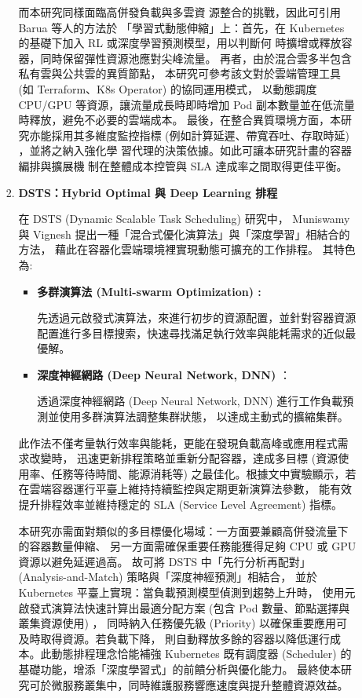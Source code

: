 \documentclass[12pt,a4paper]{article}
\begin{document}
\begin{enumerate}[label={(\zhdig*)}, leftmargin=2\parindent, listparindent=\parindent]
\begin{enumerate}[label={(\arabic*)}, leftmargin=\parindent, listparindent=\parindent]
\begin{enumerate}[label={(\zhdig*)}, leftmargin=\parindent, listparindent=\parindent]
而本研究同樣面臨高併發負載與多雲資
源整合的挑戰，因此可引用 Barua 等人的方法於
「學習式動態伸縮」上：首先，在 Kubernetes
的基礎下加入 RL 或深度學習預測模型，用以判斷何
時擴增或釋放容器，同時保留彈性資源池應對尖峰流量。
再者，由於混合雲多半包含私有雲與公共雲的異質節點，
本研究可參考該文對於雲端管理工具
(如 Terraform、K8s Operator) 的協同運用模式，
以動態調度 CPU/GPU 等資源，讓流量成長時即時增加 Pod
副本數量並在低流量時釋放，避免不必要的雲端成本。
最後，在整合異質環境方面，本研究亦能採用其多維度監控指標
(例如計算延遲、帶寬吞吐、存取時延) ，並將之納入強化學
習代理的決策依據。如此可讓本研究計畫的容器編排與擴展機
制在整體成本控管與 SLA 達成率之間取得更佳平衡。

\item \textbf{DSTS：Hybrid Optimal 與 Deep Learning 排程\cite{24}}

在 DSTS (Dynamic Scalable Task Scheduling) 研究中，
Muniswamy 與 Vignesh 提出一種「混合式優化演算法」與「深度學習」相結合的方法，
藉此在容器化雲端環境裡實現動態可擴充的工作排程。
其特色為:
    \begin{itemize}[leftmargin=\parindent, listparindent=\parindent]

\item \textbf{多群演算法 (Multi-swarm Optimization) :}


先透過元啟發式演算法，來進行初步的資源配置，並針對容器資源配置進行多目標搜索，快速尋找滿足執行效率與能耗需求的近似最優解。

\item \textbf{深度神經網路 (Deep Neural Network, DNN) }：

透過深度神經網路 (Deep Neural Network, DNN) 進行工作負載預測並使用多群演算法調整集群狀態，
以達成主動式的擴縮集群。
\end{itemize}

    此作法不僅考量執行效率與能耗，更能在發現負載高峰或應用程式需求改變時，
    迅速更新排程策略並重新分配容器，達成多目標 (資源使用率、任務等待時間、能源消耗等)
    之最佳化。根據文中實驗顯示，若在雲端容器運行平臺上維持持續監控與定期更新演算法參數，
    能有效提升排程效率並維持穩定的 SLA (Service Level Agreement) 指標。

本研究亦需面對類似的多目標優化場域：一方面要兼顧高併發流量下的容器數量伸縮、
另一方面需確保重要任務能獲得足夠 CPU 或 GPU 資源以避免延遲過高。
故可將 DSTS 中「先行分析再配對」 (Analysis-and-Match) 策略與「深度神經預測」相結合，
並於 Kubernetes 平臺上實現：當負載預測模型偵測到趨勢上升時，
使用元啟發式演算法快速計算出最適分配方案 (包含 Pod 數量、節點選擇與叢集資源使用) ，
同時納入任務優先級 (Priority) 以確保重要應用可及時取得資源。若負載下降，
則自動釋放多餘的容器以降低運行成本。此動態排程理念恰能補強 Kubernetes
既有調度器 (Scheduler) 的基礎功能，增添「深度學習式」的前饋分析與優化能力。
最終使本研究可於微服務叢集中，同時維護服務響應速度與提升整體資源效益。


\end{enumerate}
\end{enumerate}
\end{enumerate}
\end{document}
